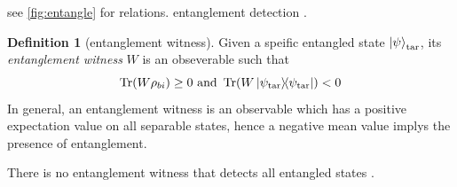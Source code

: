 \documentclass[
reprint,
aps,
pra,
floatfix,
]{revtex4-2}
\theoremstyle{plain}
\theoremstyle{definition}
\newtheorem{definition}{Definition}
\newcommand{\ew}{W}
\newcommand{\ob}{O}
\newcommand{\dm}{\rho}
\newcommand{\target}{\textup{tar}}
\begin{document}
see \cref{fig:entangle} for relations.
entanglement detection \cite{guhneEntanglementDetection2009}.
\begin{definition}[entanglement witness]\label{def:entanglement_witness}
	Given a speific entangled state $\ket{\psi}_{\target}$, its \emph{entanglement witness} $\ew$ is an obseverable such that
	\begin{equation}
		\Tr(\ew\dm_{bi}) \ge 0  \text{ and }
		\Tr(\ew\op{\psi_{\target}}) < 0 
	\end{equation}
	In general, an entanglement witness is an observable which has a positive expectation value on all separable states, hence a negative mean value implys the presence of entanglement.
\end{definition}
There is no entanglement witness that detects all entangled states \cite{heinosaariMathematicalLanguageQuantum2011}.
\end{document}
